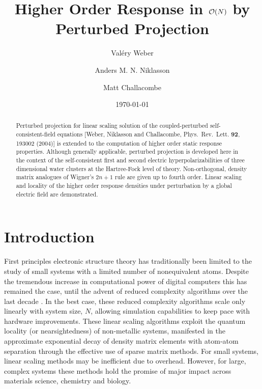 \documentclass[prl,aps,preprint,showpacs,superbib]{revtex4}
\begin{document}
\title{Higher Order Response in ${\cal O}(N)$ by Perturbed Projection} 

\author{Val\'ery Weber}
\author{Anders M. N. Niklasson}
\author{Matt Challacombe}

\date{\today}

\begin{abstract}
Perturbed projection  for linear scaling solution of the coupled-perturbed 
self-consistent-field equations 
[Weber, Niklasson and  Challacombe, Phys.\ Rev.\ Lett. {\bf 92}, 193002 (2004)] 
is extended to the computation of higher order static response properties.
Although generally applicable, perturbed projection is developed here 
in the context of the self-consistent first and second electric hyperpolarizabilities 
of three dimensional water clusters at the Hartree-Fock level of theory. 
Non-orthogonal, density matrix analogues of Wigner's $2n+1$ rule are given up to fourth order.
Linear scaling and locality of the higher order response densities under perturbation 
by a global electric field are demonstrated.  
\end{abstract}



\maketitle


\section{Introduction}
First principles electronic structure theory has traditionally been limited 
to the study of small systems with a limited number of nonequivalent atoms. 
Despite the tremendous increase in computational power of digital computers this 
has remained the case, until the advent of reduced complexity algorithms over the
last decade \cite{GGalli96,DBowler97,SGoedecker99,POrdejon00,VGogonea01,SWu02}. In the 
best case, these reduced complexity algorithms scale only linearly with system size, $N$, 
allowing simulation capabilities to keep pace with hardware improvements.
These linear scaling algorithms exploit the quantum locality (or nearsightedness) of 
non-metallic systems,  manifested in the approximate exponential decay of density matrix elements 
with atom-atom separation through the effective use of sparse matrix methods. For small systems,
linear scaling methods may be inefficient due to overhead.  However, for large, complex systems
these methods hold the promise of major impact across materials science, chemistry and biology. 
\end{document}
